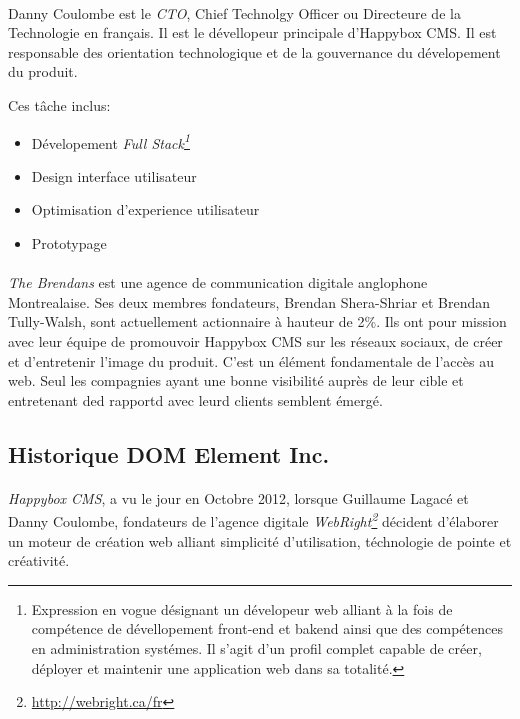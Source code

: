 \documentclass[11pt, a4paper ]{article}
\begin{document}
\paragraph{}
	Danny Coulombe est le \emph{CTO}, Chief Technolgy Officer ou Directeure de la Technologie en français. Il est le dévellopeur principale d'Happybox CMS. Il est responsable des orientation technologique et de la gouvernance du dévelopement du produit.



	Ces tâche inclus:

		\begin{itemize}

			\item
				Dévelopement \emph{Full Stack\footnote{Expression en vogue désignant un dévelopeur web alliant à la fois de compétence de dévellopement front-end et bakend ainsi que des compétences en administration systémes. Il s'agit d'un profil complet capable de créer, déployer et maintenir une application web dans sa totalité.}}
			\item
				Design interface utilisateur
			\item
				Optimisation d'experience utilisateur
			\item
				Prototypage

		\end{itemize}



\paragraph{} %
	\emph{The Brendans} est une agence de communication digitale anglophone Montrealaise. Ses deux membres fondateurs, Brendan Shera-Shriar et Brendan Tully-Walsh, sont actuellement actionnaire à hauteur de 2\%. Ils ont pour mission avec leur équipe de promouvoir Happybox CMS sur les réseaux sociaux, de créer et d'entretenir l'image du produit.
	C'est un élément fondamentale de l'accès au web. Seul les compagnies ayant une bonne visibilité auprès de leur cible et entretenant ded rapportd avec leurd clients semblent émergé.

		\subsection{Historique DOM Element Inc.}

\paragraph{}
\emph{Happybox CMS}, a vu le jour en Octobre 2012, lorsque Guillaume Lagacé et Danny Coulombe, fondateurs de l'agence digitale \emph{WebRight\footnote{\url{http://webright.ca/fr}}} décident d'élaborer un moteur de création web alliant simplicité d'utilisation, téchnologie de pointe et créativité.
\end{document}
